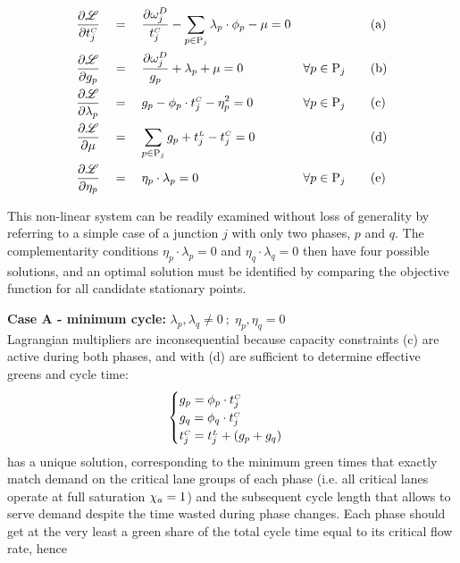 \begin{eqnarray} \label{e:lagr}
\begin{aligned}
\frac{\partial \mathscr{L}}{\partial t_{j}^{\scriptscriptstyle{C}}} & \quad = \quad 
\frac{\partial\omega_{j}^{D}}{t_{j}^{\scriptscriptstyle{C}}} - 
\sum_{p \in \mathrm{P}_j} \lambda_p \cdot \phi_p - \mu = 0 & & \mathrm{(a)}\\
\frac{\partial \mathscr{L}}{\partial g_{p}} & \quad = \quad
\frac{\partial\omega_{j}^{D}}{g_{p}} + 
\lambda_p + \mu = 0 & \forall p \in \mathrm{P}_j \qquad & \mathrm{(b)}\\
\frac{\partial \mathscr{L}}{\partial \lambda_p} & \quad = \quad
g_{p} - \phi_p \cdot t_{j}^{\scriptscriptstyle{C}} - \eta_p^2 = 0 & \forall p \in \mathrm{P}_j \qquad & \mathrm{(c)}\\
\frac{\partial \mathscr{L}}{\partial \mu} & \quad = \quad
\sum_{p \in \mathrm{P}_j} g_{p} + t_{j}^{\scriptscriptstyle{L}} - t_{j}^{\scriptscriptstyle{C}} = 0 & & \mathrm{(d)}\\
\frac{\partial \mathscr{L}}{\partial \eta_p} & \quad = \quad
\eta_p \cdot \lambda_p = 0 \qquad \qquad & \forall p \in \mathrm{P}_j \qquad & \mathrm{(e)}\\
\end{aligned}
\end{eqnarray}

This non-linear system can be readily examined without loss of generality by referring to a simple case of a junction $j$ with only two phases, $p$ and $q$.
The complementarity conditions $\eta_p \cdot \lambda_p = 0$ and $\eta_q \cdot \lambda_q = 0$ then have four possible solutions, and an optimal solution must be identified by comparing the objective function for all candidate stationary points.

\textbf{Case A - minimum cycle:} $\lambda_p,\lambda_q \neq 0 \: ; \; \eta_p, \eta_q = 0$\\
Lagrangian multipliers are inconsequential because capacity constraints (c) are active during both phases, and with (d) are sufficient to determine effective greens and cycle time:
$$
\begin{cases}
g_{p}   =  \phi_p \cdot t_{j}^{\scriptscriptstyle{C}} \\
g_{q}   =  \phi_q \cdot t_{j}^{\scriptscriptstyle{C}} \\
t_{j}^{\scriptscriptstyle{C}}  =  t_{j}^{\scriptscriptstyle{L}} + \left(g_{p} + g_{q} \right)\\
\end{cases}
$$
has a unique solution, corresponding to the minimum green times that exactly match demand on the critical lane groups of each phase (i.e. all critical lanes operate at full saturation $\chi_a = 1$) and the subsequent cycle length that allows to serve demand despite the time wasted during phase changes.
Each phase should get at the very least a green share of the total cycle time equal to its critical flow rate, hence

